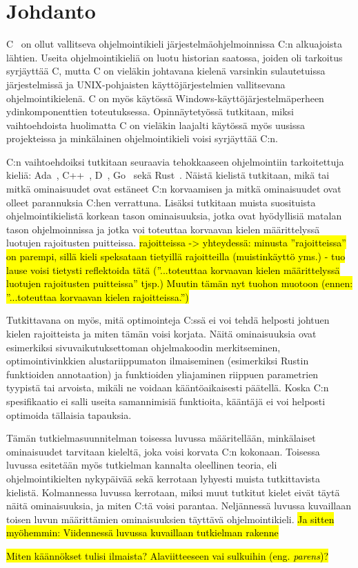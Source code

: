 \section{Johdanto} 

C~\citep{C11} on ollut vallitseva ohjelmointikieli järjestelmäohjelmoinnissa
C:n alkuajoista lähtien. Useita ohjelmointikieliä on luotu historian saatossa,
joiden oli tarkoitus syrjäyttää C, mutta C on vieläkin johtavana kielenä
varsinkin sulautetuissa järjestelmissä ja UNIX-pohjaisten käyttöjärjestelmien
vallitsevana ohjelmointikielenä. C on myös käytössä
Windows-käyttöjärjestelmäperheen ydinkomponenttien toteutuksessa.
Opinnäytetyössä tutkitaan, miksi vaihtoehdoista huolimatta C on vieläkin
laajalti käytössä myös uusissa projekteissa ja minkälainen ohjelmointikieli
voisi syrjäyttää C:n.

C:n vaihtoehdoiksi tutkitaan seuraavia tehokkaaseen ohjelmointiin tarkoitettuja
kieliä: Ada~\citep{ADA12}, C++~\citep{CPP14}, D~\citep{D}, Go~\citep{golang}
sekä Rust~\citep{rust}. Näistä kielistä tutkitaan, mikä tai mitkä ominaisuudet
ovat estäneet C:n korvaamisen ja mitkä ominaisuudet ovat olleet parannuksia
C:hen verrattuna. Lisäksi tutkitaan muista suosituista ohjelmointikielistä
korkean tason ominaisuuksia, jotka ovat hyödyllisiä matalan tason
ohjelmoinnissa ja jotka voi toteuttaa korvaavan kielen määrittelyssä luotujen
rajoitusten puitteissa. \hl{rajoitteissa -> yhteydessä: minusta
''rajoitteissa'' on parempi, sillä kieli speksataan tietyillä rajoitteilla
(muistinkäyttö yms.) - tuo lause voisi tietysti reflektoida tätä
(''...toteuttaa korvaavan kielen määrittelyssä luotujen rajoitusten
puitteissa'' tjsp.) Muutin tämän nyt tuohon muotoon (ennen: ''...toteuttaa
korvaavan kielen rajoitteissa.'')}

Tutkittavana on myös, mitä optimointeja C:ssä ei voi tehdä helposti johtuen
kielen rajoitteista ja miten tämän voisi korjata. Näitä ominaisuuksia ovat
esimerkiksi sivuvaikutuksettoman ohjelmakoodin merkitseminen,
optimointivinkkien alustariippumaton ilmaiseminen (esimerkiksi Rustin
funktioiden annotaation) ja funktioiden yliajaminen riippuen parametrien tyypistä tai arvoista, mikäli ne voidaan
kääntöaikaisesti päätellä. Koska C:n spesifikaatio ei salli useita samannimisiä
funktioita, kääntäjä ei voi helposti optimoida tällaisia tapauksia.

Tämän tutkielmasuunnitelman toisessa luvussa määritellään, minkälaiset
ominaisuudet tarvitaan kieleltä, joka voisi korvata C:n kokonaan. Toisessa
luvussa esitetään myös tutkielman kannalta oleellinen teoria, eli
ohjelmointikielten nykypäivää sekä kerrotaan lyhyesti muista tutkittavista
kielistä. Kolmannessa luvussa kerrotaan, miksi muut tutkitut kielet eivät täytä
näitä ominaisuuksia, ja miten C:tä voisi parantaa. Neljännessä luvussa
kuvaillaan toisen luvun määrittämien ominaisuuksien täyttävä ohjelmointikieli.
\hl{Ja sitten myöhemmin: Viidennessä luvussa kuvaillaan tutkielman rakenne}

\hl{Miten käännökset tulisi ilmaista? Alaviitteeseen vai
sulkuihin (eng. \emph{parens})?}
